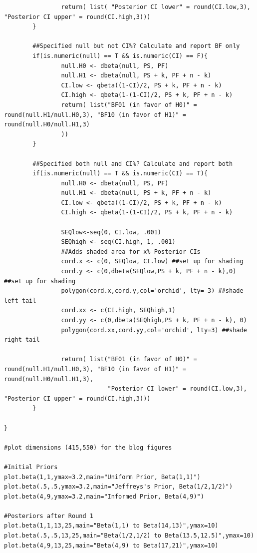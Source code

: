 \begin{lstlisting}
                return( list( "Posterior CI lower" = round(CI.low,3), "Posterior CI upper" = round(CI.high,3)))
        }
        
        ##Specified null but not CI%? Calculate and report BF only 
        if(is.numeric(null) == T && is.numeric(CI) == F){
                null.H0 <- dbeta(null, PS, PF)
                null.H1 <- dbeta(null, PS + k, PF + n - k)
                CI.low <- qbeta((1-CI)/2, PS + k, PF + n - k)
                CI.high <- qbeta(1-(1-CI)/2, PS + k, PF + n - k)
                return( list("BF01 (in favor of H0)" = round(null.H1/null.H0,3), "BF10 (in favor of H1)" = round(null.H0/null.H1,3)
                ))
        }
        
        ##Specified both null and CI%? Calculate and report both
        if(is.numeric(null) == T && is.numeric(CI) == T){
                null.H0 <- dbeta(null, PS, PF)
                null.H1 <- dbeta(null, PS + k, PF + n - k)
                CI.low <- qbeta((1-CI)/2, PS + k, PF + n - k)
                CI.high <- qbeta(1-(1-CI)/2, PS + k, PF + n - k)
                
                SEQlow<-seq(0, CI.low, .001)
                SEQhigh <- seq(CI.high, 1, .001)
                ##Adds shaded area for x% Posterior CIs
                cord.x <- c(0, SEQlow, CI.low) ##set up for shading
                cord.y <- c(0,dbeta(SEQlow,PS + k, PF + n - k),0) ##set up for shading
                polygon(cord.x,cord.y,col='orchid', lty= 3) ##shade left tail
                cord.xx <- c(CI.high, SEQhigh,1) 
                cord.yy <- c(0,dbeta(SEQhigh,PS + k, PF + n - k), 0)
                polygon(cord.xx,cord.yy,col='orchid', lty=3) ##shade right tail
                
                return( list("BF01 (in favor of H0)" = round(null.H1/null.H0,3), "BF10 (in favor of H1)" = round(null.H0/null.H1,3),
                             "Posterior CI lower" = round(CI.low,3), "Posterior CI upper" = round(CI.high,3)))
        }
        
}

#plot dimensions (415,550) for the blog figures

#Initial Priors
plot.beta(1,1,ymax=3.2,main="Uniform Prior, Beta(1,1)")
plot.beta(.5,.5,ymax=3.2,main="Jeffreys's Prior, Beta(1/2,1/2)")
plot.beta(4,9,ymax=3.2,main="Informed Prior, Beta(4,9)")

#Posteriors after Round 1
plot.beta(1,1,13,25,main="Beta(1,1) to Beta(14,13)",ymax=10)
plot.beta(.5,.5,13,25,main="Beta(1/2,1/2) to Beta(13.5,12.5)",ymax=10)
plot.beta(4,9,13,25,main="Beta(4,9) to Beta(17,21)",ymax=10)


\end{lstlisting}
